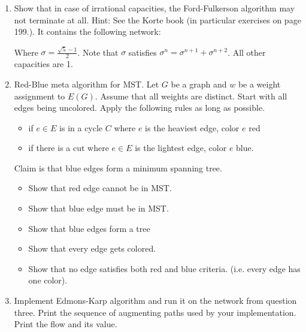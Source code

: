 \documentclass[11pt, oneside]{article}
\begin{document}
\begin{enumerate}
  \item %
    Show that in case of irrational capacities, the Ford-Fulkerson algorithm may
    not terminate at all.
    Hint: See the Korte book (in particular exercises on page 199.).
    It contains the following network:
    \begin{center}
    \end{center}
    Where $\sigma = \frac{\sqrt{5}-1}{2}$. Note that $\sigma$ satisfies
    $\sigma^n = \sigma^{n+1} + \sigma^{n+2}$. All other capacities are 1.

  \item %
    Red-Blue meta algorithm for MST.
    Let $G$ be a graph and $w$ be a weight assignment to $E(G)$.
    Assume that all weights are distinct.
    Start with all edges being uncolored.
    Apply the following rules as long as possible.
    \begin{itemize}
      \item if $e \in E$ is in a cycle $C$ where $e$ is the heaviest edge, color $e$ red
      \item if there is a cut where $e\in E$ is the lightest edge, color $e$ blue.
    \end{itemize}
    Claim is that blue edges form a minimum spanning tree.
    \begin{itemize}
      \item Show that red edge cannot be in MST.
      \item Show that blue edge must be in MST.
      \item Show that blue edges form a tree
      \item Show that every edge gets colored.
      \item Show that no edge satisfies both red and blue criteria. (i.e. every edge has one color).
    \end{itemize}

  \item %
    Implement Edmons-Karp algorithm and run it on the network from question three.
    Print the sequence of augmenting paths used by your implementation.
    Print the flow and its value.
\end{enumerate}
\end{document}
